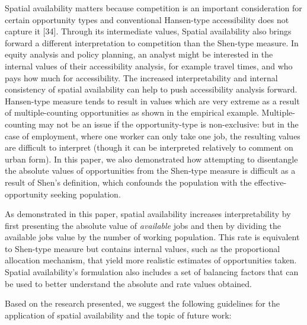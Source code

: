 \documentclass[10pt,letterpaper]{article}
\begin{document}
Spatial availability matters because competition is an important
consideration for certain opportunity types and conventional Hansen-type
accessibility does not capture it {[}34{]}. Through its intermediate
values, Spatial availability also brings forward a different
interpretation to competition than the Shen-type measure. In equity
analysis and policy planning, an analyst might be interested in the
internal values of their accessibility analysis, for example travel
times, and who pays how much for accessibility. The increased
interpretability and internal consistency of spatial availability can
help to push accessibility analysis forward. Hansen-type measure tends
to result in values which are very extreme as a result of
multiple-counting opportunities as shown in the empirical example.
Multiple-counting may not be an issue if the opportunity-type is
non-exclusive: but in the case of employment, where one worker can only
take one job, the resulting values are difficult to interpret (though it
can be interpreted relatively to comment on urban form). In this paper,
we also demonstrated how attempting to disentangle the absolute values
of opportunities from the Shen-type measure is difficult as a result of
Shen's definition, which confounds the population with the
effective-opportunity seeking population.

As demonstrated in this paper, spatial availability increases
interpretability by first presenting the absolute value of
\emph{available} jobs and then by dividing the available jobs value by
the number of working population. This rate is equivalent to Shen-type
measure but contains internal values, such as the proportional
allocation mechanism, that yield more realistic estimates of
opportunities taken. Spatial availability's formulation also includes a
set of balancing factors that can be used to better understand the
absolute and rate values obtained.

Based on the research presented, we suggest the following guidelines for
the application of spatial availability and the topic of future work:
\end{document}
